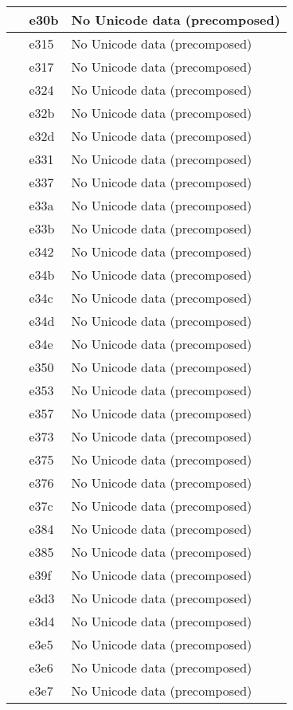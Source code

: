 \documentclass[12pt,letterpaper,openany]{book}
\begin{document}
\begin{center}
\begin{supertabular}{|m{0.25in}|m{0.5in}|m{4in}|}
 & e30b & No Unicode data (precomposed)\\\hline
 & e315 & No Unicode data (precomposed)\\\hline
 & e317 & No Unicode data (precomposed)\\\hline
 & e324 & No Unicode data (precomposed)\\\hline
 & e32b & No Unicode data (precomposed)\\\hline
 & e32d & No Unicode data (precomposed)\\\hline
 & e331 & No Unicode data (precomposed)\\\hline
 & e337 & No Unicode data (precomposed)\\\hline
 & e33a & No Unicode data (precomposed)\\\hline
 & e33b & No Unicode data (precomposed)\\\hline
 & e342 & No Unicode data (precomposed)\\\hline
 & e34b & No Unicode data (precomposed)\\\hline
 & e34c & No Unicode data (precomposed)\\\hline
 & e34d & No Unicode data (precomposed)\\\hline
 & e34e & No Unicode data (precomposed)\\\hline
 & e350 & No Unicode data (precomposed)\\\hline
 & e353 & No Unicode data (precomposed)\\\hline
 & e357 & No Unicode data (precomposed)\\\hline
 & e373 & No Unicode data (precomposed)\\\hline
 & e375 & No Unicode data (precomposed)\\\hline
 & e376 & No Unicode data (precomposed)\\\hline
 & e37c & No Unicode data (precomposed)\\\hline
 & e384 & No Unicode data (precomposed)\\\hline
 & e385 & No Unicode data (precomposed)\\\hline
 & e39f & No Unicode data (precomposed)\\\hline
 & e3d3 & No Unicode data (precomposed)\\\hline
 & e3d4 & No Unicode data (precomposed)\\\hline
 & e3e5 & No Unicode data (precomposed)\\\hline
 & e3e6 & No Unicode data (precomposed)\\\hline
 & e3e7 & No Unicode data (precomposed)\\\hline

\end{supertabular}
\end{center}
\end{document}
